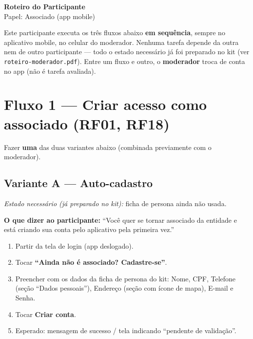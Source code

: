 \documentclass[11pt,a4paper]{article}
\newcommand{\dizer}[1]{%
  \noindent\colorbox{lightbg}{%
    \begin{minipage}{0.95\linewidth}
    \vspace{1mm}
    \textbf{O que dizer ao participante:} ``#1''
    \vspace{1mm}
    \end{minipage}%
  }\vspace{3mm}
}
\newcommand{\estado}[1]{%
  \noindent\textit{Estado necessário (já preparado no kit):} #1
  \vspace{2mm}
}
\begin{document}
\begin{center}
  {\LARGE\bfseries\color{brandgreen} Roteiro do Participante}\\[2mm]
  {\large Papel: Associado (app mobile)}
\end{center}

\vspace{2mm}
\noindent\colorbox{lightbg}{%
  \begin{minipage}{0.95\linewidth}
  \vspace{1mm}
  Este participante executa os três fluxos abaixo \textbf{em sequência}, sempre no aplicativo
  mobile, no celular do moderador. Nenhuma tarefa depende da outra nem de outro participante ---
  todo o estado necessário já foi preparado no kit (ver \texttt{roteiro-moderador.pdf}). Entre um
  fluxo e outro, o \textbf{moderador} troca de conta no app (não é tarefa avaliada).
  \vspace{1mm}
  \end{minipage}%
}

\section*{Fluxo 1 --- Criar acesso como associado (RF01, RF18)}

Fazer \textbf{uma} das duas variantes abaixo (combinada previamente com o moderador).

\subsection*{Variante A --- Auto-cadastro}

\estado{ficha de persona ainda não usada.}

\dizer{Você quer se tornar associado da entidade e está criando sua conta pelo aplicativo pela
primeira vez.}

\begin{enumerate}[leftmargin=6mm]
  \item Partir da tela de login (app deslogado).
  \item Tocar \textbf{``Ainda não é associado? Cadastre-se''}.
  \item Preencher com os dados da ficha de persona do kit: Nome, CPF, Telefone (seção ``Dados
    pessoais''), Endereço (seção com ícone de mapa), E-mail e Senha.
  \item Tocar \textbf{Criar conta}.
  \item Esperado: mensagem de sucesso / tela indicando ``pendente de validação''.
\end{enumerate}
\end{document}
